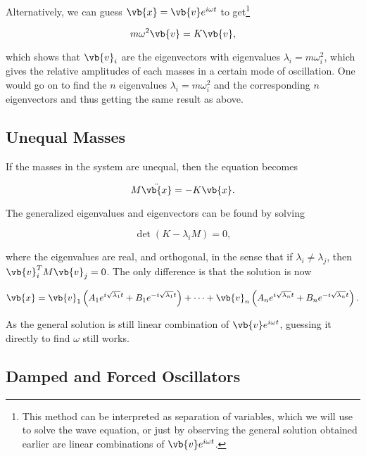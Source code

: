 \documentclass[a4paper,12pt]{report}
\begin{document}
Alternatively, we can guess \(\vb{x} = \vb{v} e^{i \omega t} \) to get\footnote{This method can be interpreted as separation of variables, which we will use to solve the wave equation, or just by observing the general solution obtained earlier are linear combinations of \(\vb{v} e^{i \omega t} \).} 

\begin{equation}
	m \omega ^2 \vb{v} = K \vb{v} ,
\end{equation}

which shows that \(\vb{v} _{i} \) are the eigenvectors with eigenvalues \(\lambda _{i} =  m \omega _{i}^2\), which gives the relative amplitudes of each masses in a certain mode of oscillation. One would go on to find the \(n\) eigenvalues \(\lambda _{i} = m \omega _{i}^2  \) and the corresponding \(n\) eigenvectors and thus getting the same result as above.

\subsection{Unequal Masses}

If the masses in the system are unequal, then the equation becomes 

\begin{equation}
    M \ddot{\vb{x} } = -K\vb{x}. \label{normal2} 
\end{equation}

The generalized eigenvalues and eigenvectors can be found by solving 

\begin{equation}
    \det (K-\lambda _{i}M ) = 0,
\end{equation}

where the eigenvalues are real, and orthogonal, in the sense that if \(\lambda _{i} \neq \lambda _{j}  \), then \(\vb{v} _{i}^T M \vb{v} _{j}  =0\). The only difference is that the solution is now

\begin{equation}
	\vb{x} = \vb{v} _{1}\left(A_1 e^{i\sqrt{\lambda _{1}  } t} + B_1 e^{-i\sqrt{\lambda _{1}  } t}\right) + \cdots + \vb{v} _{n} \left(A_{n} e^{i\sqrt{\lambda _{n}  } t} + B_{n} e^{-i\sqrt{\lambda _{n}  } t}\right).
\end{equation}

As the general solution is still linear combination of \(\vb{v} e^{i \omega t} \), guessing it directly to find \(\omega \) still works.  

\subsection{Damped and Forced Oscillators}
\end{document}
